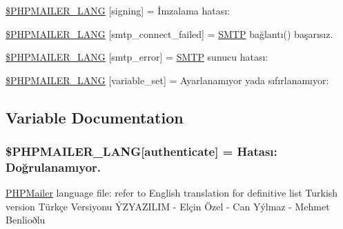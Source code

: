\begin{DoxyCompactItemize}
\item 
\hyperlink{phpmailer_8lang-tr_8php_a68e437bdb9b968a5a67320f03d231565}{\$\+P\+H\+P\+M\+A\+I\+L\+E\+R\+\_\+\+L\+A\+NG} \mbox{[}\textquotesingle{}signing\textquotesingle{}\mbox{]} = \textquotesingle{}İmzalama hatası\+: \textquotesingle{}
\item 
\hyperlink{phpmailer_8lang-tr_8php_a7b321d4ca1e9df702403ed4c61aa0980}{\$\+P\+H\+P\+M\+A\+I\+L\+E\+R\+\_\+\+L\+A\+NG} \mbox{[}\textquotesingle{}smtp\+\_\+connect\+\_\+failed\textquotesingle{}\mbox{]} = \textquotesingle{}\hyperlink{class_s_m_t_p}{S\+M\+TP} bağlantı() başarısız.\textquotesingle{}
\item 
\hyperlink{phpmailer_8lang-tr_8php_a7d9cffba1e669c845f8a4c891ee50064}{\$\+P\+H\+P\+M\+A\+I\+L\+E\+R\+\_\+\+L\+A\+NG} \mbox{[}\textquotesingle{}smtp\+\_\+error\textquotesingle{}\mbox{]} = \textquotesingle{}\hyperlink{class_s_m_t_p}{S\+M\+TP} sunucu hatası\+: \textquotesingle{}
\item 
\hyperlink{phpmailer_8lang-tr_8php_af795debc7a739d038742691c358d9032}{\$\+P\+H\+P\+M\+A\+I\+L\+E\+R\+\_\+\+L\+A\+NG} \mbox{[}\textquotesingle{}variable\+\_\+set\textquotesingle{}\mbox{]} = \textquotesingle{}Ayarlanamıyor yada sıfırlanamıyor\+: \textquotesingle{}
\end{DoxyCompactItemize}


\subsection{Variable Documentation}
\subsubsection[{\texorpdfstring{\$\+P\+H\+P\+M\+A\+I\+L\+E\+R\+\_\+\+L\+A\+NG}{$PHPMAILER_LANG}}]{\setlength{\rightskip}{0pt plus 5cm}\$P\+H\+P\+M\+A\+I\+L\+E\+R\+\_\+\+L\+A\+NG\mbox{[}\textquotesingle{}authenticate\textquotesingle{}\mbox{]} =  Hatası\+: Doğrulanamıyor.\textquotesingle{}}\hypertarget{phpmailer_8lang-tr_8php_a2cb33073c989b85580748e331ed8b4aa}{}\label{phpmailer_8lang-tr_8php_a2cb33073c989b85580748e331ed8b4aa}
\hyperlink{class_p_h_p_mailer}{P\+H\+P\+Mailer} language file\+: refer to English translation for definitive list Turkish version Türkçe Versiyonu Ý\+Z\+Y\+A\+Z\+I\+L\+IM -\/ Elçin Özel -\/ Can Yýlmaz -\/ Mehmet Benlioðlu 


